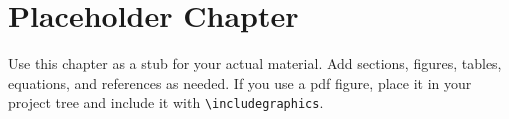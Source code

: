 \documentclass[11pt]{uncthesis}
\begin{document}
\chapter{Placeholder Chapter}

Use this chapter as a stub for your actual material. Add sections,
figures, tables, equations, and references as needed. If you use a
\gls{pdf} figure, place it in your project tree and include it with
\verb|\includegraphics|.

\backmatter

\printbibliography
\end{document}
